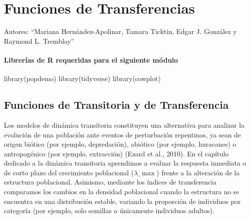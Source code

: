 \documentclass[
  12pt,
  letterpaper,
]{book}
\author{}
\date{}
\newenvironment{Shaded}{\begin{snugshade}}{\end{snugshade}}
\newcommand{\FunctionTok}[1]{\textcolor[rgb]{0.28,0.35,0.67}{#1}}
\newcommand{\NormalTok}[1]{\textcolor[rgb]{0.00,0.23,0.31}{#1}}
\renewcommand*\contentsname{Table of contents}
\newcommand\contentsname{Table of contents}
\begin{document}
\frontmatter

\renewcommand*\contentsname{Table of contents}
{
\hypersetup{linkcolor=}
\setcounter{tocdepth}{2}
\tableofcontents
}

\mainmatter
\chapter{Funciones de Transferencias}\label{funciones-de-transferencias}

Autores: ``Mariana Hernández-Apolinar, Tamara Ticktin, Edgar J. González
y Raymond L. Tremblay''

\subsubsection{Librerías de R requeridas para el siguiente
módulo}\label{libreruxedas-de-r-requeridas-para-el-siguiente-muxf3dulo}

\begin{Shaded}
\begin{Highlighting}[]
\FunctionTok{library}\NormalTok{(popdemo)}
\FunctionTok{library}\NormalTok{(tidyverse)}
\FunctionTok{library}\NormalTok{(cowplot)}
\end{Highlighting}
\end{Shaded}

\section{Funciones de Transitoria y de
Transferencia}\label{funciones-de-transitoria-y-de-transferencia}

Los modelos de dinámica transitoria constituyen una alternativa para
analizar la evolución de una población ante eventos de perturbación
repentinos, ya sean de origen biótico (por ejemplo, depredación),
abiótico (por ejemplo, huracanes) o antropogénico (por ejemplo,
extracción) (Ezard et al., 2010). En el capítulo dedicado a la dinámica
transitoria aprendimos a evaluar la respuesta inmediata o de corto plazo
del crecimiento poblacional (\(\lambda\_{\max}\)) frente a la alteración
de la estructura poblacional. Asimismo, mediante los índices de
transferencia comparamos los cambios en la densidad poblacional cuando
la estructura no se encuentra en una distribución estable, variando la
proporción de individuos por categoría (por ejemplo, solo semillas o
únicamente individuos adultos).
\end{document}
